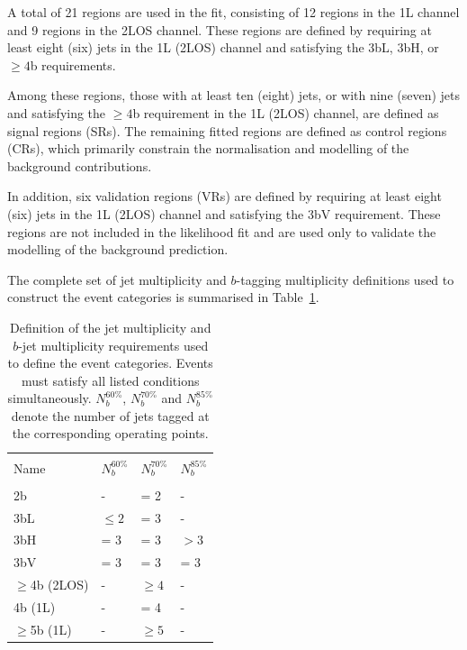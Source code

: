 A total of 21 regions are used in the fit, consisting of 12 regions in
the 1L channel and 9 regions in the 2LOS channel. These regions are
defined by requiring at least eight (six) jets in the 1L (2LOS)
channel and satisfying the 3bL, 3bH, or $\ge4$b requirements.

Among these regions, those with at least ten (eight) jets, or with nine
(seven) jets and satisfying the $\ge4$b requirement in the
1L (2LOS) channel, are defined as signal regions (SRs). The remaining
fitted regions are defined as control regions (CRs), which primarily
constrain the normalisation and modelling of the background
contributions.

In addition, six validation regions (VRs) are defined by requiring at
least eight (six) jets in the 1L (2LOS) channel and satisfying the
3bV requirement. These regions are not included in the likelihood fit
and are used only to validate the modelling of the background
prediction.

The complete set of jet multiplicity and $b$-tagging multiplicity definitions used
to construct the event categories is summarised in
Table~\ref{tab:regions}.

\begin{table}[htbp]
  \centering
  \caption{
    Definition of the jet multiplicity and $b$-jet multiplicity requirements
    used to define the event categories.
    Events must satisfy all listed conditions simultaneously.
    $N_b^{60\%}$, $N_b^{70\%}$ and $N_b^{85\%}$
    denote the number of jets tagged at the corresponding
    operating points.
  }
  \begin{tabular}{m{6em}m{5em}m{5em}m{5em}}
    \hline
    \\[-1em]
    Name & $N_b^{60\%}$ & $N_b^{70\%}$ & $N_b^{85\%}$ \\
    \\[-1em]
    \hline
    2b             & -       & = 2     & - \\
    3bL            & $\le 2$ & = 3     & - \\
    3bH            & = 3     & = 3     & $> 3$ \\
    3bV            & = 3     & = 3     & = 3 \\
    $\ge$4b (2LOS) & -       & $\ge 4$ & - \\
    4b (1L)        & -       & = 4     & - \\
    $\ge$5b (1L)   & -       & $\ge 5$ & - \\
    \hline
  \end{tabular}
  \label{tab:regions}
\end{table}

